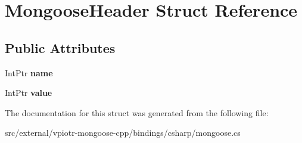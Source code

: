 \hypertarget{struct_mongoose_header}{\section{Mongoose\-Header Struct Reference}
\label{struct_mongoose_header}
}
\subsection*{Public Attributes}
\begin{DoxyCompactItemize}
\item 
\hypertarget{struct_mongoose_header_aaa35c6b64831a00b678cb7bd0f51ca35}{Int\-Ptr {\bfseries name}}\label{struct_mongoose_header_aaa35c6b64831a00b678cb7bd0f51ca35}

\item 
\hypertarget{struct_mongoose_header_afa27ccc144e348253360db22d473ba0e}{Int\-Ptr {\bfseries value}}\label{struct_mongoose_header_afa27ccc144e348253360db22d473ba0e}

\end{DoxyCompactItemize}


The documentation for this struct was generated from the following file\-:\begin{DoxyCompactItemize}
\item 
src/external/vpiotr-\/mongoose-\/cpp/bindings/csharp/mongoose.\-cs\end{DoxyCompactItemize}
